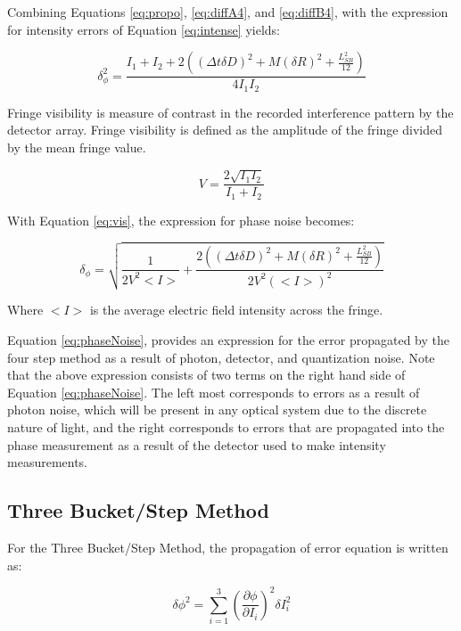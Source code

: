 \documentclass[10pt,letterpaper]{article}
\begin{document}
Combining Equations \ref{eq:propo}, \ref{eq:diffA4}, and \ref{eq:diffB4}, with the expression for intensity errors of Equation \ref{eq:intense} yields:

\begin{equation}
\delta_\phi^2=\frac{I_1+I_2+2\left((\Delta t\delta D)^2+M(\delta R)^2+\frac{L_{SB}^2}{12}\right)}{4I_1I_2}
\end{equation}

Fringe visibility is measure of contrast in the recorded interference pattern by the detector array. Fringe visibility is defined as the amplitude of the fringe divided by the mean fringe value.

\begin{equation}
\label{eq:vis}
V=\frac{2\sqrt{I_1I_2}}{I_1+I_2}
\end{equation}

With Equation \ref{eq:vis}, the expression for phase noise becomes:

\begin{equation}
\label{eq:phaseNoise}
\delta_\phi=\sqrt{\frac{1}{2V^2<I>}+\frac{2\left((\Delta t\delta D)^2+M(\delta R)^2+\frac{L_{SB}^2}{12}\right)}{2V^2(<I>)^2}}
\end{equation}

Where $<I>$ is the average electric field intensity across the fringe.\par

Equation \ref{eq:phaseNoise}, provides an expression for the error propagated by the four step method  as a result of photon, detector, and quantization noise. Note that the above expression consists of two terms on the right hand side of Equation \ref{eq:phaseNoise}. The left most corresponds to errors as a result of photon noise, which will be present in any optical system due to the discrete nature of light, and the right corresponds to errors that are propagated into the phase measurement as a result of the detector used to make intensity measurements.\par

\subsection{Three Bucket/Step Method}

For the Three Bucket/Step Method, the propagation of error equation is written as:

\begin{equation}
\label{eq:3propo}
\delta\phi^2=\sum_{i=1}^3\left(\frac{\partial \phi}{\partial I_i}\right)^2\delta I_i^2
\end{equation}
\end{document}

